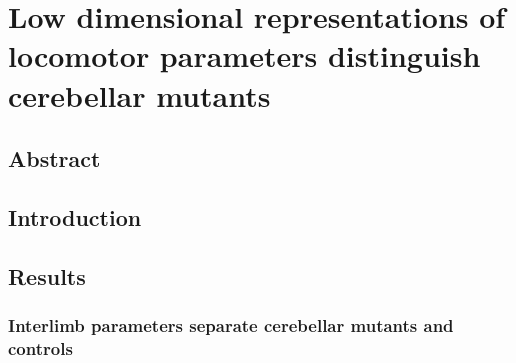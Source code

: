 
%

\chapter{Low dimensional representations of locomotor parameters distinguish cerebellar mutants}
\label{cha:lda}
\glsresetall

\section{Abstract}
\section{Introduction}

\section{Results}
\subsection{Interlimb parameters separate cerebellar mutants and controls}

